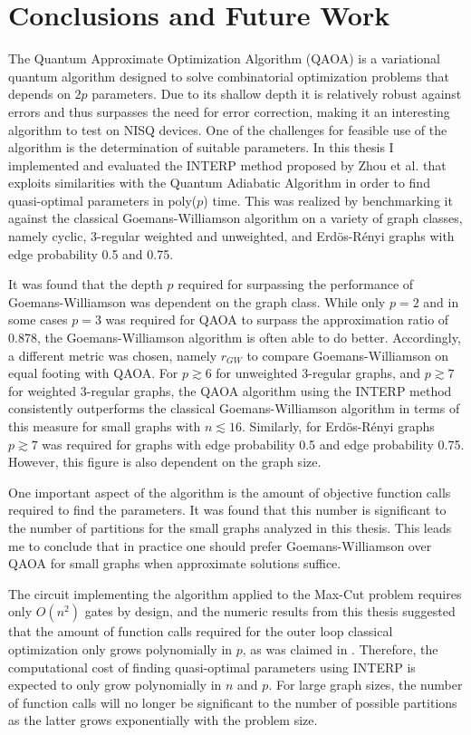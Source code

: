 \chapter{Conclusions and Future Work}
\label{chap:conclusions}

The Quantum Approximate Optimization Algorithm (QAOA) is a variational quantum algorithm designed to solve combinatorial optimization problems that depends on $2p$ parameters. Due to its shallow depth it is relatively robust against errors and thus surpasses the need for error correction, making it an interesting algorithm to test on NISQ devices. One of the challenges for feasible use of the algorithm is the determination of suitable parameters. In this thesis I implemented and evaluated the INTERP method proposed by Zhou et al. \cite{ZWCPL18} that exploits similarities with the Quantum Adiabatic Algorithm in order to find quasi-optimal parameters in poly($p$) time. This was realized by benchmarking it against the classical Goemans-Williamson algorithm on a variety of graph classes, namely cyclic, 3-regular weighted and unweighted, and Erd\"os-R\'enyi graphs with edge probability 0.5 and 0.75. 

It was found that the depth $p$ required for surpassing the performance of Goemans-Williamson was dependent on the graph class. While only $p=2$ and in some cases $p=3$ was required for QAOA to surpass the approximation ratio of 0.878, the Goemans-Williamson algorithm is often able to do better. Accordingly, a different metric was chosen, namely $r_{GW}$ to compare Goemans-Williamson on equal footing with QAOA. For $p \gtrsim 6$ for unweighted 3-regular graphs, and $p \gtrsim 7$ for weighted 3-regular graphs, the QAOA algorithm using the INTERP method consistently outperforms the classical Goemans-Williamson algorithm in terms of this measure for small graphs with $n \lesssim 16$. Similarly, for Erd\"os-R\'enyi graphs $p \gtrsim 7$ was required for graphs with edge probability 0.5 and edge probability 0.75. However, this figure is also dependent on the graph size.

One important aspect of the algorithm is the amount of objective function calls required to find the parameters. It was found that this number is significant to the number of partitions for the small graphs analyzed in this thesis. This leads me to conclude that in practice one should prefer Goemans-Williamson over QAOA for small graphs when approximate solutions suffice.

The circuit implementing the algorithm applied to the Max-Cut problem requires only $O(n^2)$ gates by design, and the numeric results from this thesis suggested that the amount of function calls required for the outer loop classical optimization only grows polynomially in $p$, as was claimed in \cite{ZWCPL18}.  Therefore, the computational cost of finding quasi-optimal parameters using INTERP is expected to only grow polynomially in $n$ and $p$. For large graph sizes, the number of function calls will no longer be significant to the number of possible partitions as the latter grows exponentially with the problem size.

